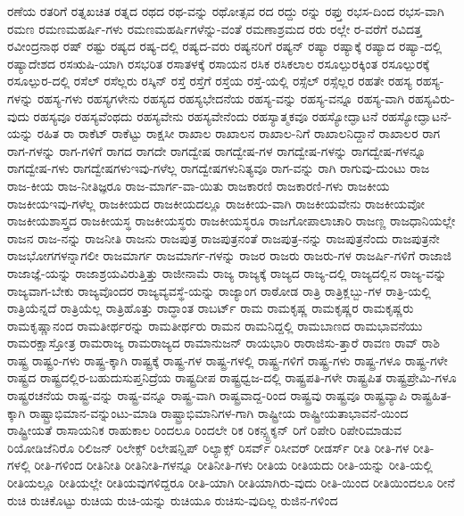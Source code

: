 {ರಣೆಯ
ರತರಿಗೆ
ರತ್ನಖಚಿತ
ರತ್ನದ
ರಥದ
ರಥ-ವನ್ನು
ರಥೋತ್ಸವ
ರದ
ರದ್ದು
ರನ್ನು
ರಫ್ತು
ರಭಸ-ದಿಂದ
ರಭಸ-ವಾಗಿ
ರಮಣ
ರಮಣಮಹರ್ಷಿ-ಗಳು
ರಮಣಮಹರ್ಷಿಗಳೆನ್ನು-ವಂತೆ
ರಮಣಾಶ್ರಮದ
ರರು
ರಲ್ಲೇ
ರ-ವರೆಗೆ
ರವಿದತ್ತ
ರವೀಂದ್ರನಾಥ
ರಷ್
ರಷ್ಟು
ರಷ್ಯದ
ರಷ್ಯ-ದಲ್ಲಿ
ರಷ್ಯದ-ವರು
ರಷ್ಯನರಿಗೆ
ರಷ್ಯನ್
ರಷ್ಯಾ
ರಷ್ಯಾಕ್ಕೆ
ರಷ್ಯಾದ
ರಷ್ಯಾ-ದಲ್ಲಿ
ರಷ್ಯಾದೇಶದ
ರಸಋಷಿ-ಯಾಗಿ
ರಸಭರಿತ
ರಸಾತಳಕ್ಕೆ
ರಸಾಯನ
ರಸಿಕ
ರಸಿಕಲಾಲ
ರಸೂಲ್ಪುರಕ್ಕಿಂತ
ರಸೂಲ್ಪುರಕ್ಕೆ
ರಸೂಲ್ಪುರ-ದಲ್ಲಿ
ರಸೆಲ್
ರಸೆಲ್ಲರು
ರಸ್ಕಿನ್
ರಸ್ತೆ
ರಸ್ತೆಗೆ
ರಸ್ತೆಯ
ರಸ್ತೆ-ಯಲ್ಲಿ
ರಸ್ಸೆಲ್
ರಸ್ಸೆಲ್ಲರ
ರಹತೇ
ರಹಸ್ಯ
ರಹಸ್ಯ-ಗಳನ್ನು
ರಹಸ್ಯ-ಗಳು
ರಹಸ್ಯಗಳೇನು
ರಹಸ್ಯದ
ರಹಸ್ಯಭೇದನೆಯ
ರಹಸ್ಯ-ವನ್ನು
ರಹಸ್ಯ-ವನ್ನೂ
ರಹಸ್ಯ-ವಾಗಿ
ರಹಸ್ಯವಿರು-ವುದು
ರಹಸ್ಯವೂ
ರಹಸ್ಯವೆಂಥದು
ರಹಸ್ಯವೇನು
ರಹಸ್ಯವೇನೆಂದು
ರಹಸ್ಯಾತ್ಮಕವೂ
ರಹಸ್ಯೋದ್ಘಾಟನೆ
ರಹಸ್ಯೋದ್ಘಾಟನೆ-ಯನ್ನು
ರಹಿತ
ರಾ
ರಾಕೆಟ್
ರಾಕೆಟ್ಟು
ರಾಕ್ಷಸೀ
ರಾಖಾಲ
ರಾಖಾಲನ
ರಾಖಾಲ-ನಿಗೆ
ರಾಖಾಲನಿದ್ದಾನೆ
ರಾಖಾಲರ
ರಾಗ
ರಾಗ-ಗಳನ್ನು
ರಾಗ-ಗಳಿಗೆ
ರಾಗದ
ರಾಗದೇ
ರಾಗದ್ವೇಷ
ರಾಗದ್ವೇಷ-ಗಳ
ರಾಗದ್ವೇಷ-ಗಳನ್ನು
ರಾಗದ್ವೇಷ-ಗಳನ್ನೂ
ರಾಗದ್ವೇಷ-ಗಳು
ರಾಗದ್ವೇಷಗಳುಇವು-ಗಳೆಲ್ಲ
ರಾಗದ್ವೇಷಗಳುನಿತ್ಯವೂ
ರಾಗ-ವನ್ನು
ರಾಗಿ
ರಾಗುವು-ದುಂಟು
ರಾಜ
ರಾಜ-ಕೀಯ
ರಾಜ-ನೀತಿಜ್ಞರೂ
ರಾಜ-ಮಾರ್ಗ-ವಾ-ಯಿತು
ರಾಜಕಾರಣಿ
ರಾಜಕಾರಣಿ-ಗಳು
ರಾಜಕೀಯ
ರಾಜಕೀಯಇವು-ಗಳೆಲ್ಲ
ರಾಜಕೀಯದ
ರಾಜಕೀಯದಲ್ಲೂ
ರಾಜಕೀಯ-ವಾಗಿ
ರಾಜಕೀಯವೇನು
ರಾಜಕೀಯವೋ
ರಾಜಕೀಯಶಾಸ್ತ್ರದ
ರಾಜಕೀಯಸ್ಥ
ರಾಜಕೀಯಸ್ಥರು
ರಾಜಕೀಯಸ್ಥರೂ
ರಾಜಗೋಪಾಲಾಚಾರಿ
ರಾಜಣ್ಣ
ರಾಜಧಾನಿಯಲ್ಲೇ
ರಾಜನ
ರಾಜ-ನನ್ನು
ರಾಜನೀತಿ
ರಾಜನು
ರಾಜಪುತ್ರ
ರಾಜಪುತ್ರನಂತೆ
ರಾಜಪುತ್ರ-ನನ್ನು
ರಾಜಪುತ್ರನೆಂದು
ರಾಜಪುತ್ರನೇ
ರಾಜಭೋಗಗಳನ್ನಾಗಲೀ
ರಾಜಮಾರ್ಗ
ರಾಜಮಾರ್ಗ-ಗಳನ್ನು
ರಾಜರ
ರಾಜರು
ರಾಜರು-ಗಳ
ರಾಜರ್ಷಿ-ಗಳಿಗೆ
ರಾಜಾಜಿ
ರಾಜಾಜ್ಞೆ-ಯನ್ನು
ರಾಜಾಶ್ರಯವಿರುತ್ತಿತ್ತು
ರಾಜೀನಾಮೆ
ರಾಜ್ಯ
ರಾಜ್ಯಕ್ಕೆ
ರಾಜ್ಯದ
ರಾಜ್ಯ-ದಲ್ಲಿ
ರಾಜ್ಯದಲ್ಲಿನ
ರಾಜ್ಯ-ವನ್ನು
ರಾಜ್ಯವಾಗ-ಬೇಕು
ರಾಜ್ಯವೊಂದರ
ರಾಜ್ಯವ್ಯವಸ್ಥೆ-ಯನ್ನು
ರಾಜ್ಯಾಂಗ
ರಾಠೋಡ
ರಾತ್ರಿ
ರಾತ್ರಿಕ್ಲಬ್ಬು-ಗಳ
ರಾತ್ರಿ-ಯಲ್ಲಿ
ರಾತ್ರಿಯೆನ್ನದೆ
ರಾತ್ರಿಯೆಲ್ಲ
ರಾತ್ರಿಹೊತ್ತು
ರಾದ್ಧಾಂತ
ರಾಬರ್ಟ್
ರಾಮ
ರಾಮಕೃಷ್ಣ
ರಾಮಕೃಷ್ಣರ
ರಾಮಕೃಷ್ಣರು
ರಾಮಕೃಷ್ಣಾನಂದ
ರಾಮತೀರ್ಥರನ್ನು
ರಾಮತೀರ್ಥರು
ರಾಮನ
ರಾಮನಿದ್ದಲ್ಲಿ
ರಾಮಬಾಣದ
ರಾಮಭಾವನೆಯು
ರಾಮರಕ್ಷಾಸ್ತೋತ್ರ
ರಾಮರಾಜ್ಯ
ರಾಮರಾಜ್ಯದ
ರಾಮಾನುಜನ್
ರಾಯಭಾರಿ
ರಾರಾಜಿಸು-ತ್ತಾರೆ
ರಾವಣ
ರಾವ್
ರಾಶಿ
ರಾಷ್ಟ್ರ
ರಾಷ್ಟ್ರಂ-ಗಳು
ರಾಷ್ಟ್ರ-ಕ್ಕಾಗಿ
ರಾಷ್ಟ್ರಕ್ಕೆ
ರಾಷ್ಟ್ರ-ಗಳ
ರಾಷ್ಟ್ರ-ಗಳಲ್ಲಿ
ರಾಷ್ಟ್ರ-ಗಳಿಗೆ
ರಾಷ್ಟ್ರ-ಗಳು
ರಾಷ್ಟ್ರ-ಗಳೂ
ರಾಷ್ಟ್ರ-ಗಳೇ
ರಾಷ್ಟ್ರದ
ರಾಷ್ಟ್ರದಲ್ಲಿರ-ಬಹುದುಸುಪ್ತನಿದ್ರೆಯ
ರಾಷ್ಟ್ರದೀಪ
ರಾಷ್ಟ್ರಧ್ವಜ-ದಲ್ಲಿ
ರಾಷ್ಟ್ರಪತಿ-ಗಳೇ
ರಾಷ್ಟ್ರಪಿತ
ರಾಷ್ಟ್ರಪ್ರೇಮಿ-ಗಳೂ
ರಾಷ್ಟ್ರರಚನೆಯ
ರಾಷ್ಟ್ರ-ವನ್ನು
ರಾಷ್ಟ್ರ-ವನ್ನೂ
ರಾಷ್ಟ್ರ-ವಾಗಿ
ರಾಷ್ಟ್ರವಾದ್ದ-ರಿಂದ
ರಾಷ್ಟ್ರವು
ರಾಷ್ಟ್ರವೂ
ರಾಷ್ಟ್ರವ್ಯಾಪಿ
ರಾಷ್ಟ್ರಹಿತ-ಕ್ಕಾಗಿ
ರಾಷ್ಟ್ರಾಭಿಮಾನ-ವನ್ನುಂಟು-ಮಾಡಿ
ರಾಷ್ಟ್ರಾಭಿಮಾನಿಗಳ-ಗಾಗಿ
ರಾಷ್ಟ್ರೀಯ
ರಾಷ್ಟ್ರೀಯತಾಭಾವನೆ-ಯಿಂದ
ರಾಷ್ಟ್ರೀಯತೆ
ರಾಸಾಯನಿಕ
ರಾಹುಕಾಲ
ರಿಂದಲೂ
ರಿಂದಲೇ
ರಿಕ
ರಿಕನ್ಸ್ಟ್ರಕ್ಶನ್
ರಿಗೆ
ರಿಪೇರಿ
ರಿಪೇರಿಮಾಡುವ
ರಿಯೋಡಿಜೆನಿರೊ
ರಿಲಿಜನ್
ರಿಲೇಕ್ಸ್
ರಿಲೇಷನ್ಷಿಪ್
ರಿಲ್ಯಾಕ್ಸ್
ರಿಸರ್ವ್
ರಿಸೀವರ್
ರೀಡರ್ಸ್
ರೀತಿ
ರೀತಿ-ಗಳ
ರೀತಿ-ಗಳಲ್ಲಿ
ರೀತಿ-ಗಳಿಂದ
ರೀತಿನೀತಿ
ರೀತಿನೀತಿ-ಗಳನ್ನೂ
ರೀತಿನೀತಿ-ಗಳು
ರೀತಿಯ
ರೀತಿಯದು
ರೀತಿ-ಯನ್ನು
ರೀತಿ-ಯಲ್ಲಿ
ರೀತಿಯಲ್ಲೂ
ರೀತಿಯಲ್ಲೇ
ರೀತಿಯವುಗಳಿದ್ದರೂ
ರೀತಿ-ಯಾಗಿ
ರೀತಿಯಾಗಿರು-ವುದು
ರೀತಿ-ಯಿಂದ
ರೀತಿಯಿಂದಲೂ
ರೀನೆ
ರುಚಿ
ರುಚಿಕೊಟ್ಟು
ರುಚಿಯ
ರುಚಿ-ಯನ್ನು
ರುಚಿಯೂ
ರುಚಿಸು-ವುದಿಲ್ಲ
ರುಜಿನ-ಗಳಿಂದ
}
